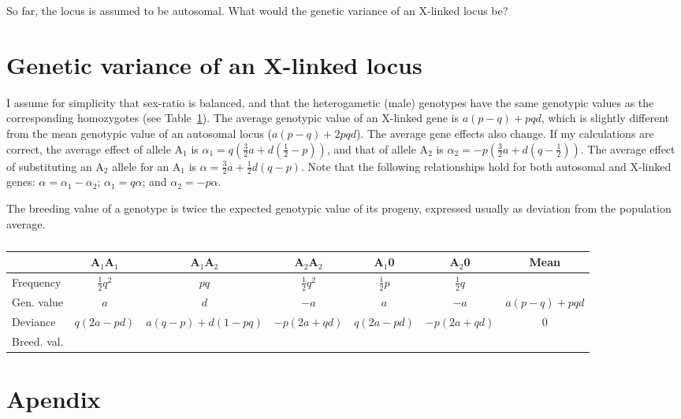 \documentclass[a4paper,12pt]{article}
\begin{document}
So far, the locus is assumed to be autosomal. What would the genetic variance of an X-linked locus be?

\section{Genetic variance of an X-linked locus}
I assume for simplicity that sex-ratio is balanced, and that the heterogametic (male) genotypes have the same genotypic values as the corresponding homozygotes (see Table~\ref{tau:xlinked}). The average genotypic value of an X-linked gene is $a(p-q)+pqd$, which is slightly different from the mean genotypic value of an autosomal locus ($a(p-q)+2pqd$). The average gene effects also change. If my calculations are correct, the average effect of allele A$_1$ is $\alpha{}_1 = q(\frac{3}{2}a + d(\frac{1}{2}-p))$, and that of allele A$_2$ is $\alpha{}_2 = -p(\frac{3}{2}a + d(q-\frac{1}{2}))$. The average effect of substituting an A$_2$ allele for an A$_1$ is $\alpha = \frac{3}{2}a + \frac{1}{2}d(q-p)$. Note that the following relationships hold for both autosomal and X-linked genes: $\alpha = \alpha{}_1 - \alpha{}_2$; $\alpha{}_1 = q\alpha$; and $\alpha{}_2 = -p\alpha$.

The breeding value of a genotype is twice the expected genotypic value of its progeny, expressed usually as deviation from the population average.

\begin{table}
\begin{center}
\caption{}\label{tau:xlinked}
\vspace*{0.3cm}
{\small
\begin{tabular}{p{2.4cm}cccccc}
\toprule
&A$_1$A$_1$&A$_1$A$_2$&A$_2$A$_2$&A$_1$0&A$_2$0&Mean\\
\midrule
Frequency&$\frac{1}{2}q^2$&$pq$&$\frac{1}{2}q^2$&$\frac{1}{2}p$&$\frac{1}{2}q$&\\
Gen. value&$a$&$d$&$-a$&$a$&$-a$&$a(p-q)+pqd$\\
Deviance&$q(2a-pd)$&$a(q-p)+d(1-pq)$&$-p(2a+qd)$&$q(2a-pd)$&$-p(2a+qd)$&0\\
Breed. val.&&&&&&\\
\bottomrule
\end{tabular}
}
\end{center}
\end{table}

\section{Apendix}



\end{document}
